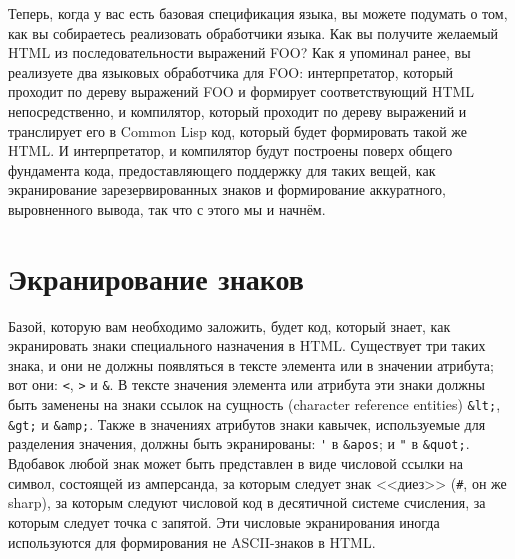 Теперь, когда у вас есть базовая спецификация языка, вы можете подумать о том, как вы
собираетесь реализовать обработчики языка. Как вы получите желаемый HTML из
последовательности выражений FOO? Как я упоминал ранее, вы реализуете два языковых
обработчика для FOO: интерпретатор, который проходит по дереву выражений FOO и формирует
соответствующий HTML непосредственно, и компилятор, который проходит по дереву выражений и
транслирует его в Common Lisp код, который будет формировать такой же HTML. И
интерпретатор, и компилятор будут построены поверх общего фундамента кода, предоставляющего
поддержку для таких вещей, как экранирование зарезервированных знаков и формирование
аккуратного, выровненного вывода, так что с этого мы и начнём.

\section{Экранирование знаков}

Базой, которую вам необходимо заложить, будет код, который знает, как экранировать знаки
специального назначения в HTML. Существует три таких знака, и они не должны появляться в
тексте элемента или в значении атрибута; вот они: \lstinline{<}, \lstinline{>} и
\lstinline!&!. В тексте значения элемента или атрибута эти знаки должны быть заменены на
знаки ссылок на сущность (character reference entities) \lstinline!&lt;!, \lstinline!&gt;!
и \lstinline!&amp;!. Также в значениях атрибутов знаки кавычек, используемые для
разделения значения, должны быть экранированы: \lstinline!'! в \lstinline!&apos!; и
\lstinline!"! в \lstinline!&quot;!. Вдобавок любой знак может быть представлен в виде
числовой ссылки на символ, состоящей из амперсанда, за которым следует знак <<диез>>
(\lstinline!#!, он же sharp), за которым следуют числовой код в десятичной системе
счисления, за которым следует точка с запятой. Эти числовые экранирования иногда
используются для формирования не ASCII-знаков в HTML.


